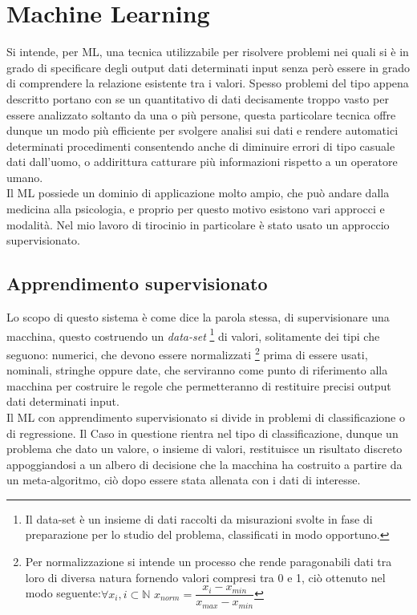 \chapter{Machine Learning}
\nocite{Nilsson96introductionto}Si intende, per ML, una tecnica utilizzabile per risolvere problemi  nei quali si è in grado di specificare degli output dati determinati input senza però essere in grado di comprendere la relazione esistente tra i valori. Spesso problemi del tipo appena descritto portano con se un quantitativo di dati decisamente troppo vasto per essere analizzato soltanto da una o più persone, questa particolare tecnica offre dunque un modo più efficiente per svolgere analisi sui dati e rendere automatici determinati procedimenti consentendo anche di diminuire errori di tipo casuale dati dall'uomo, o addirittura catturare più informazioni rispetto a un operatore umano.\\
Il ML possiede un dominio di applicazione molto ampio, che può andare dalla medicina alla psicologia, e proprio per questo motivo esistono vari approcci e modalità. Nel mio lavoro di tirocinio in particolare è stato usato un approccio supervisionato. 
\section{Apprendimento supervisionato}
Lo scopo di questo sistema è come dice la parola stessa, di supervisionare una macchina, questo costruendo un \emph{data-set}  \footnote{Il data-set è un insieme di dati raccolti da misurazioni svolte in fase di preparazione per lo studio del problema, classificati in modo opportuno.}
di valori, solitamente dei tipi che seguono: numerici, che devono essere normalizzati \footnote{Per normalizzazione si intende un processo che rende paragonabili dati tra loro di diversa natura fornendo valori compresi tra 0 e 1, ciò ottenuto nel modo seguente:\newline $\forall x_{i}, i\subset\mathbb{N}$ $x_{norm} = \dfrac{x_{i}-x_{min}}{x_{max} - x_{min}} $} prima di essere usati, nominali, stringhe oppure date, che serviranno come punto di riferimento alla macchina per costruire le regole che permetteranno di restituire precisi output dati determinati input.\\
Il ML con apprendimento supervisionato si divide in problemi di classificazione o di regressione. Il Caso in questione rientra nel tipo di classificazione, dunque un problema che dato un valore, o insieme di valori, restituisce un risultato discreto appoggiandosi a un albero di decisione che la macchina ha costruito a partire da un meta-algoritmo, ciò dopo essere stata allenata con i dati di interesse.
